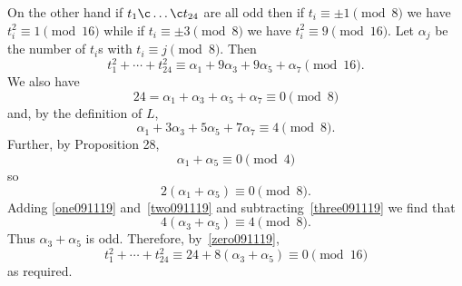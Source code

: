 On the other hand if $t_1\c \dotsc\c t_{24}$ are all odd then if $t_i\equiv\pm1\pmod8$ we have $t_i^2\equiv1\pmod{16}$ while if $t_i\equiv\pm3\pmod8$ we have $t_i^2\equiv9\pmod{16}$.  Let $\alpha_j$ be the number of $t_i$s with $t_i\equiv j\pmod8$.  Then
\begin{equation} t_1^2 + \dotsb + t_{24}^2 \equiv \alpha_1 + 9\alpha_3 + 9\alpha_5 + \alpha_7 \pmod{16} \label{zero091119} . \end{equation}
We also have
\begin{equation} 24 = \alpha_1 + \alpha_3 + \alpha_5 + \alpha_7 \equiv 0 \pmod 8 \label{one091119} \end{equation}
and, by the definition of $L$,
\begin{equation} \alpha_1 + 3\alpha_3 + 5\alpha_5 + 7\alpha_7 \equiv 4 \pmod 8 \label{two091119} . \end{equation}
Further, by Proposition 28,
\[ \alpha_1 + \alpha_5 \equiv 0 \pmod 4 \]
so
\begin{equation} 2(\alpha_1+\alpha_5)\equiv0\pmod8 \label{three091119} . \end{equation}
Adding \eqref{one091119} and~\eqref{two091119} and subtracting~\eqref{three091119} we find that
\[ 4(\alpha_3+\alpha_5) \equiv 4 \pmod 8 . \]
Thus $\alpha_3+\alpha_5$ is odd.  Therefore, by~\eqref{zero091119},
\[ t_1^2 + \dotsb + t_{24}^2 \equiv 24 + 8(\alpha_3+\alpha_5) \equiv 0 \pmod {16} \]
as required.
%
%
%
%
%
